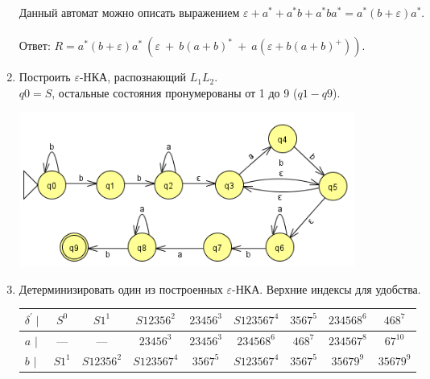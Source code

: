 \documentclass[fleqn,12pt, a4paper]{article}
\newcommand {\eps} {\varepsilon}
\begin{document}
\begin{enumerate}[label=(\roman{*})]

	\vspace{1em}

	Данный автомат можно описать выражением $\eps + a^* + a^*b + a^*ba^* = a^*(b+\eps)a^*$.\\\\
	Ответ: $R = a^*(b+\eps)a^*\ (\eps\ +\ b(a+b)^*\ +\ a (\eps + b(a+b)^+))$.

	\newpage

	\item Построить $\eps$-НКА, распознающий $L_1 L_2$. \\ $q0 = S$, остальные состояния пронумерованы от 1 до 9 ($q1 - q9$).

	\includegraphics[width=11cm]{task3_NF}


	\item Детерминизировать один из построенных $\eps$-НКА. Верхние индексы для удобства.

	\begin{tabular}{lcccccccc}
		\toprule
		\multicolumn{1}{c}{
			$\delta^\prime \mid$
		}
		& \multicolumn{1}{c}{ $S^0$ }
		& \multicolumn{1}{c}{ $S1^1$ }
		& \multicolumn{1}{c}{ $S12356^2$ }
		& \multicolumn{1}{c}{ $23456^3$ }
		& \multicolumn{1}{c}{ $S123567^4$ }
		& \multicolumn{1}{c}{ $3567^5$ }
		& \multicolumn{1}{c}{ $234568^6$ }
		& \multicolumn{1}{c}{ $468^7$ }

		\\
		\midrule

		$a$ $\mid$ &
		--- & --- & $23456^3$ & $23456^3$ & $234568^6$ & $468^7$ & $234567^8$ &  $67^{10}$  \\
		$b$ $\mid$ &
		$S1^1$ & $S12356^2$ & $S123567^4$ & $3567^5$ & $S123567^4$ & $3567^5$ & $35679^9$ & $35679^9$ \\
		\bottomrule
	\end{tabular}


\end{enumerate}
\end{document}
